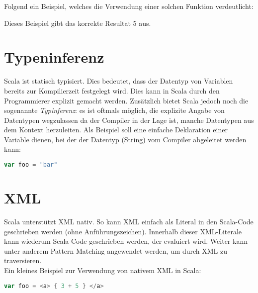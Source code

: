 Folgend ein Beispiel, welches die Verwendung einer solchen Funktion
verdeutlicht: 



Dieses Beispiel gibt das korrekte Resultat 5 aus.


\section{Typeninferenz}

Scala ist statisch typisiert. Dies bedeutet, dass der Datentyp von
Variablen bereits zur Kompilierzeit festgelegt wird. Dies kann in Scala
durch den Programmierer explizit gemacht werden. Zusätzlich bietet Scala
jedoch noch die sogenannte \emph{Typinferenz}: es ist oftmals möglich,
die explizite Angabe von Datentypen wegzulassen da der Compiler in der
Lage ist, manche Datentypen aus dem Kontext herzuleiten. Als Beispiel
soll eine einfache Deklaration einer Variable dienen, bei der der Datentyp
(String) vom Compiler abgeleitet werden kann:

\begin{lstlisting}[float=ht,language=scala,caption=Automatisch hergeleiteter Datentyp,label=lst:typeinference]
var foo = "bar"
\end{lstlisting}


\section{XML}

Scala unterstützt XML nativ. So kann XML einfach als Literal in den
Scala-Code geschrieben werden (ohne Anführungszeichen). Innerhalb
dieser XML-Literale kann wiederum Scala-Code geschrieben werden, der
evaluiert wird.  Weiter kann unter anderem Pattern Matching angewendet
werden, um durch XML zu traversieren. \\

Ein kleines Beispiel zur Verwendung von nativem XML in Scala:
\begin{lstlisting}[float=ht,language=scala,caption={XML mit Code, der evaluiert wird},label=lst:xml]
var foo = <a> { 3 + 5 } </a>
\end{lstlisting}


